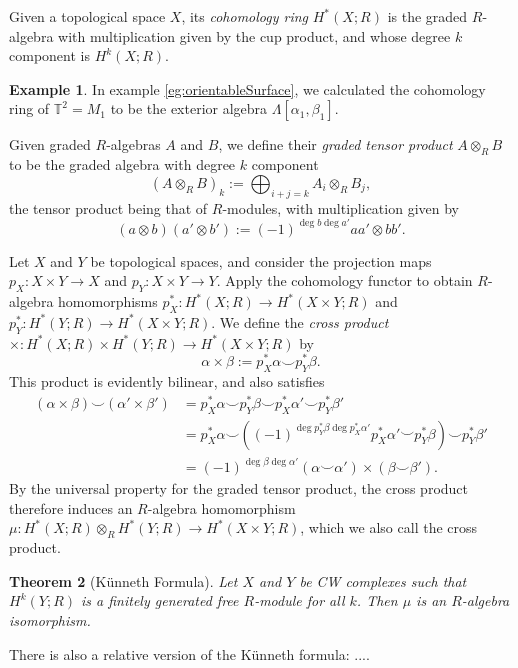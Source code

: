 \documentclass{book}
\newcommand{\bbT}{\mathbb{T}}
\newtheorem{theorem}{Theorem}[section]
\theoremstyle{definition}
\newtheorem{example}[theorem]{Example}
\theoremstyle{remark}
\numberwithin{equation}{section}
\begin{document}
Given a topological space $X$, its \textit{cohomology ring} $H^*(X;R)$ is the graded $R$-algebra with multiplication given by the cup product, and whose degree $k$ component is $H^k(X;R)$.
\begin{example}
    In example \ref{eg:orientableSurface}, we calculated the cohomology ring of $\bbT^2 = M_1$ to be the exterior algebra $\Lambda[\alpha_1,\beta_1]$.
\end{example}

Given graded $R$-algebras $A$ and $B$, we define their \textit{graded tensor product} $A \otimes_R B$ to be the graded algebra with degree $k$ component
\begin{equation}
    (A \otimes_R B)_k := \bigoplus_{i+j=k} A_i \otimes_R B_j,
\end{equation}
the tensor product being that of $R$-modules, with multiplication given by 
\begin{equation}
    (a \otimes b)(a' \otimes b') := (-1)^{\deg{b}\deg{a'}} aa' \otimes bb'.
\end{equation}

Let $X$ and $Y$ be topological spaces, and consider the projection maps $p_X \colon X \times Y \to X$ and $p_Y \colon X \times Y \to Y$. Apply the cohomology functor to obtain $R$-algebra homomorphisms $p_X^* \colon H^*(X;R) \to H^*(X \times Y;R)$ and $p_Y^* \colon H^*(Y;R) \to H^*(X \times Y;R)$. We define the \textit{cross product} $\times \colon H^*(X;R) \times H^*(Y;R) \to H^*(X \times Y;R)$ by
\begin{equation}
    \alpha \times \beta := p^*_X \alpha \smile p^*_Y \beta.
\end{equation}
This product is evidently bilinear, and also satisfies 
\begin{equation} \begin{aligned}
    (\alpha \times \beta) \smile (\alpha' \times \beta')
    &= p_X^* \alpha \smile p_Y^* \beta \smile p_X^* \alpha' \smile p_Y^* \beta' \\
    &= p_X^* \alpha \smile ( (-1)^{\deg{p_Y^* \beta} \deg{p_X^* \alpha'}} p_X^* \alpha' \smile p_Y^* \beta ) \smile p_Y^* \beta' \\
    &= (-1)^{\deg{\beta} \deg{\alpha'}} (\alpha \smile \alpha') \times (\beta \smile \beta').
\end{aligned} \end{equation}
By the universal property for the graded tensor product, the cross product therefore induces an $R$-algebra homomorphism $\mu \colon H^*(X;R) \otimes_R H^*(Y;R) \to H^*(X \times Y;R)$, which we also call the cross product.
\begin{theorem}[K\"unneth Formula]
    Let $X$ and $Y$ be CW complexes such that $H^k(Y;R)$ is a finitely generated free $R$-module for all $k$. Then $\mu$ is an $R$-algebra isomorphism.
\end{theorem}
There is also a relative version of the K\"unneth formula:
....
\end{document}

